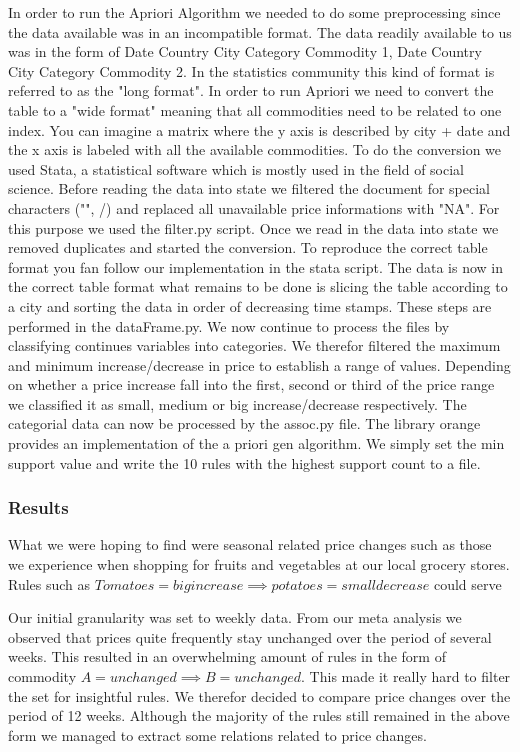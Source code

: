 In order to run the Apriori Algorithm we needed to do some preprocessing since the data available was in an incompatible format. The data readily available to us was in the form 
of Date Country City Category Commodity 1, Date Country City Category Commodity 2. In the statistics community this kind of format is referred to as the "long format". In order to run Apriori we need to convert the table to a "wide format" meaning that all commodities need to be related to one index. You can imagine a matrix where the y axis is described by city + date and the x axis is labeled with all the available commodities. To do the conversion we used Stata, a statistical software which is mostly used in the field of social science. Before reading the data into state we filtered the document for special characters ("", /) and replaced all unavailable price informations with "NA". For this purpose we used the filter.py script. Once we read in the data into state we removed duplicates and started the conversion. To reproduce the correct table format you fan follow our implementation in the stata script.  The data is now in the correct table format what remains to be done is slicing the table according to a city and sorting the data in order of decreasing time stamps. These steps are performed in the dataFrame.py. We now continue to process the files by classifying continues variables into categories. We therefor filtered the maximum and minimum increase/decrease in price to establish a range of values. Depending on whether a price increase fall into the first, second or third of the price range we classified it as small, medium or big increase/decrease respectively. The categorial data can now be processed by the assoc.py file. The library orange provides an implementation of the a priori gen algorithm. We simply set the min support value and write the 10 rules with the highest support count to a file. 

\subsubsection{Results}

What we were hoping to find were seasonal related price changes such as those we experience when shopping for fruits and vegetables at our local grocery stores. Rules such as $Tomatoes = big increase \implies potatoes = small decrease$ could serve 


Our initial granularity was set to weekly data. From our meta analysis we observed that prices quite frequently stay unchanged over the period of several weeks. This resulted in an overwhelming amount of rules in the form of commodity $A = unchanged \implies B= unchanged$. This made it really hard to filter the set for insightful rules. We therefor decided to compare price changes over the period of 12 weeks. Although the majority of the rules still remained in the above form we managed to extract some relations related to price changes. 

